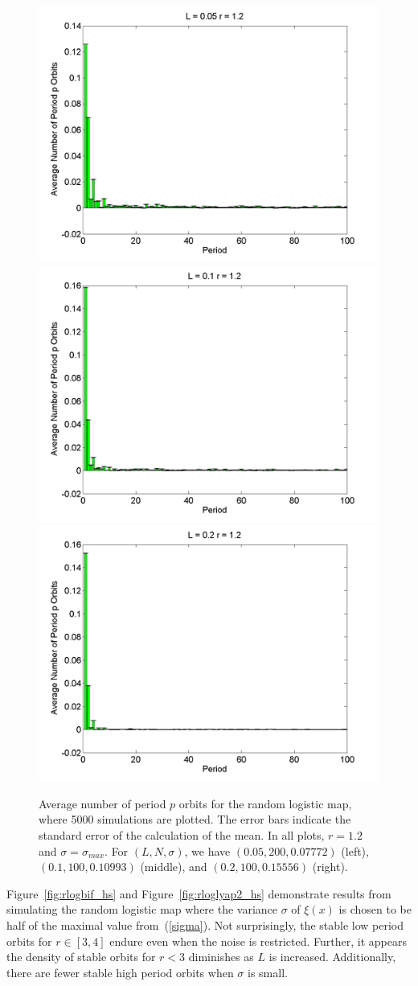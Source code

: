 \begin{figure}[H]\linespread{1}
\caption[Average number of period $p$ orbits for the random logistic
map, $\sigma=\sigma_{max}$ and $r=1.2$]{Average number of period $p$ orbits for the random logistic
map, where 5000 simulations are plotted. The error bars indicate
the standard error of the calculation of the mean. In all plots,
$r=1.2$ and $\sigma=\sigma_{max}$. For $(L,N,\sigma)$,
we have $(0.05, 200, 0.07772)$ (left), $(0.1, 100, 0.10993)$
(middle), and $(0.2, 100, 0.15556)$ (right).}\label{fig:rloghist2}
	\begin{center}	\includegraphics[width=.33\textwidth]{figs/rlog_hist_L_005_r_12_s_007772_a_000015098_sims_5000.png}\hfill
\includegraphics[width=.33\textwidth]{figs/rlog_hist_L_01_r_12_s_010993_a_000060373_sims_5000.png}\hfill	
\includegraphics[width=.33\textwidth]{figs/rlog_hist_L_02_r_12_s_015556_a_00024119_sims_5000.png}
	\end{center}
\end{figure}

Figure~\ref{fig:rlogbif_hs} and Figure~\ref{fig:rloglyap2_hs}
demonstrate results from simulating the random logistic map where the
variance $\sigma$ of $\xi(x)$ is chosen to be half of the maximal
value from~(\ref{sigma}). Not surprisingly, the stable low period
orbits for $r \in [3,4]$ endure even
when the noise is restricted. Further, it appears the density of
stable orbits for $r<3$ diminishes as $L$ is increased. Additionally,
there are fewer stable high period orbits when $\sigma$ is small.

